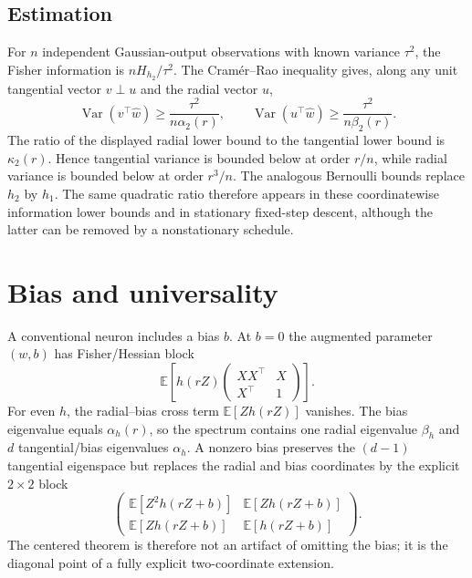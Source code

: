 \documentclass[11pt]{article}
\newcommand{\E}{\mathbb E}
\begin{document}
\subsection{Estimation}

For $n$ independent Gaussian-output observations with known variance $\tau^2$, the Fisher information is
$nH_{h_2}/\tau^2$.  The Cram\'er--Rao inequality gives, along any unit tangential vector $v\perp u$ and the radial
vector $u$,
\begin{equation}
 \operatorname{Var}(v^\top\widehat w)\ge\frac{\tau^2}{n\alpha_2(r)},\qquad
 \operatorname{Var}(u^\top\widehat w)\ge\frac{\tau^2}{n\beta_2(r)}.
 \label{eq:crgauss}
\end{equation}
The ratio of the displayed radial lower bound to the tangential lower bound is $\kappa_2(r)$.  Hence tangential
variance is bounded below at order $r/n$, while radial variance is bounded below at order
$r^3/n$.  The analogous Bernoulli bounds replace $h_2$ by $h_1$.  The same quadratic ratio therefore appears in
these coordinatewise information lower bounds and in stationary fixed-step descent, although the latter can be
removed by a nonstationary schedule.

\section{Bias and universality}

A conventional neuron includes a bias $b$.  At $b=0$ the augmented parameter $(w,b)$ has Fisher/Hessian block
\[
 \E\!\left[h(rZ)
 \begin{pmatrix}XX^\top&X\\X^\top&1\end{pmatrix}\right].
\]
For even $h$, the radial--bias cross term $\E[Zh(rZ)]$ vanishes.  The bias eigenvalue equals $\alpha_h(r)$, so
the spectrum contains one radial eigenvalue $\beta_h$ and $d$ tangential/bias eigenvalues $\alpha_h$.  A nonzero
bias preserves the $(d-1)$ tangential eigenspace but replaces the radial and bias coordinates by the explicit
$2\times2$ block
\begin{equation}
 \begin{pmatrix}
  \E[Z^2h(rZ+b)] & \E[Zh(rZ+b)]\\
  \E[Zh(rZ+b)] & \E[h(rZ+b)]
 \end{pmatrix}.
 \label{eq:biasblock}
\end{equation}
The centered theorem is therefore not an artifact of omitting the bias; it is the diagonal point of a fully explicit
two-coordinate extension.
\end{document}
